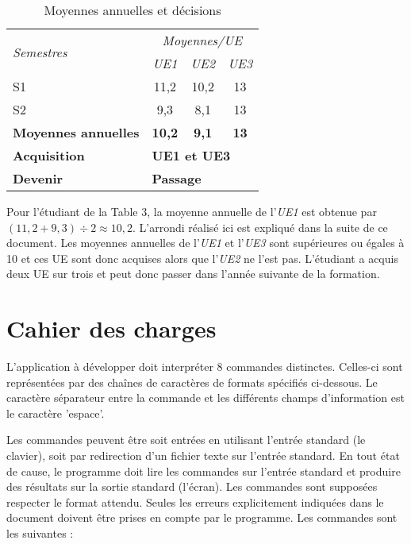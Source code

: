 \documentclass[10pt,a4paper,oneside]{article}
\begin{document}
\begin{table}[h]
	\centering
	\begin{tabular}{|l|c|c|c|} \hline
		 \multirow{2}{*}{\textit{Semestres}} & \multicolumn{3}{c|}{\textit{Moyennes/UE}} \\ \cline{2-4}
		  & \textit{UE1} & \textit{UE2} & \textit{UE3} \\ \hline\hline
		S1 & 11,2 & 10,2 & 13 \\ \hline
		S2 & 9,3 & 8,1 & 13 \\ \hline \hline
		\textbf{Moyennes annuelles} & \textbf{10,2} & \textbf{9,1} & \textbf{13} \\ \hline 
		\textbf{Acquisition} & \multicolumn{3}{l|}{\textbf{UE1 et UE3}} \\ \hline 
		\textbf{Devenir} & \multicolumn{3}{l|}{\textbf{Passage}} \\ \hline 
	\end{tabular}
	\caption{Moyennes annuelles et décisions}
	\label{tab:MoyennesAnnuelles}
\end{table}

Pour l'étudiant de la Table 3, la moyenne annuelle de l'\textit{UE1} est obtenue par $(11,2 + 9,3) \div 2 \approx 10,2$. L'arrondi réalisé ici est expliqué dans la suite de ce document. Les moyennes annuelles de l'\textit{UE1} et l'\textit{UE3} sont supérieures ou égales à 10 et ces UE sont donc acquises alors que l'\textit{UE2} ne l'est pas. L'étudiant a acquis deux UE sur trois et peut donc passer dans l'année suivante de la formation. 

\section{Cahier des charges}

L'application à développer doit interpréter 8 commandes distinctes. Celles-ci sont représentées par des chaînes de caractères de formats spécifiés ci-dessous. Le caractère séparateur entre la commande et les différents champs d'information est le caractère 'espace'.  

Les commandes peuvent être soit entrées en utilisant l'entrée standard (le clavier), soit par redirection d'un fichier texte sur l'entrée standard. En tout état de cause, le programme doit lire les commandes sur l'entrée standard et produire des résultats sur la sortie standard (l'écran). Les commandes sont supposées respecter le format attendu. Seules les erreurs explicitement indiquées dans le document doivent être prises en compte par le programme. Les commandes sont les suivantes :
\end{document}
